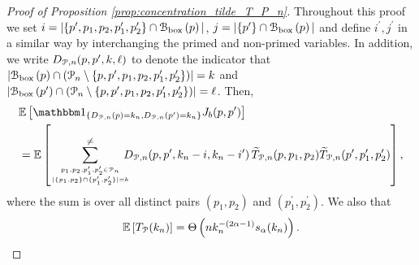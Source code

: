\begin{proof}[Proof of Proposition \ref{prop:concentration_tilde_T_P_n}]

Throughout this proof we set $i = |\{p^\prime, p_1, p_2, p_1^\prime, p_2^\prime\} \cap {\mathcal B}_{\text{box}}\left(p\right)|$, $j = |\{p^\prime\} \cap {\mathcal B}_{\text{box}}\left(p\right)|$ and define $i^\prime, j^\prime$ in a similar way by interchanging the primed and non-primed variables. In addition, we write $D_{{\mathcal P},n}(p,p^\prime,k,\ell)$ to denote the indicator that $|{\mathcal B}_{\text{box}}\left(p\right) \cap ({\mathcal P}_n \setminus \{p, p^\prime, p_1, p_2, p_1^\prime, p_2^\prime\})| = k$ and $|{\mathcal B}_{\text{box}}\left(p^\prime\right) \cap ({\mathcal P}_n \setminus \{p, p^\prime, p_1, p_2, p_1^\prime, p_2^\prime\})| = \ell$. Then, 
\begin{align*}
	&\Exp{\ind{D_{\Pcal,n}(p) = k_n, D_{\Pcal,n}(p^\prime) = k_n} J_b(p,p^\prime)}\\
	&= \Exp{\sum_{p_1, p_2, p_1^\prime, p_2^\prime \in \Pcal_n 
		\atop |\{p_1, p_2\} \cap \{p_1^\prime, p_2^\prime\}| = b}^{\ne}
			\hspace{-7pt} D_{\Pcal,n}(p,p^\prime, k_n-i,k_n- i^\prime) \,
			\widetilde{T}_{\Pcal,n}(p,p_1,p_2) \widetilde{T}_{\Pcal,n}(p^\prime, p_1^\prime, p_2^\prime)},
\end{align*}
where the sum is over all distinct pairs $(p_1, p_2)$ and $(p_1^\prime, p_2^\prime)$. We also that 
\[
	\mathbb{E}\left[T_{{\mathcal P}}(k_n)\right] = \Theta\left(n k_n^{-(2\alpha - 1)} s_\alpha(k_n)\right).
\]



\end{proof}
